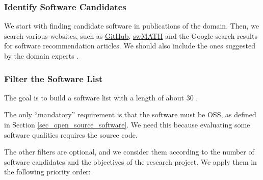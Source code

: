 \documentclass[3p, 12pt,authoryear]{elsarticle}
\begin{document}
\subsubsection{Identify Software Candidates} \label{sec_identify_software_candidates}

We start with finding candidate software in publications of the domain. Then, we
search various websites, such as \hyperlink{https://github.com/}{GitHub},
\hyperlink{https://swmath.org/}{swMATH} and the Google search results for
software recommendation articles. We should also include the ones suggested by
the domain experts \citep{SmithEtAl2021}.

\subsubsection{Filter the Software List} \label{sec_filter_software_list}

The goal is to build a software list with a length of about 30
\citep{SmithEtAl2021}.

The only ``mandatory'' requirement is that the software must be OSS, as defined
in Section \ref{sec_open_source_software}. We need this because evaluating some
software qualities requires the source code.

The other filters are optional, and we consider them according to the number of
software candidates and the objectives of the research project. We apply them in
the following priority order:
\end{document}
